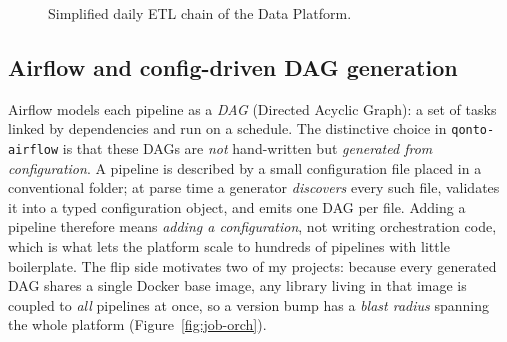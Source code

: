 \begin{figure}[H]
\centering
{}
\caption{Simplified daily ETL chain of the Data Platform.}
\label{fig:archi-platform}
\end{figure}

\subsection{Airflow and config-driven DAG generation}

Airflow models each pipeline as a \emph{DAG} (Directed Acyclic Graph): a set of tasks linked by dependencies and run on a schedule. The distinctive choice in \texttt{qonto-airflow} is that these DAGs are \emph{not} hand-written but \emph{generated from configuration}. A pipeline is described by a small configuration file placed in a conventional folder; at parse time a generator \emph{discovers} every such file, validates it into a typed configuration object, and emits one DAG per file. Adding a pipeline therefore means \emph{adding a configuration}, not writing orchestration code, which is what lets the platform scale to hundreds of pipelines with little boilerplate. The flip side motivates two of my projects: because every generated DAG shares a single Docker base image, any library living in that image is coupled to \emph{all} pipelines at once, so a version bump has a \emph{blast radius} spanning the whole platform (Figure~\ref{fig:job-orch}).

